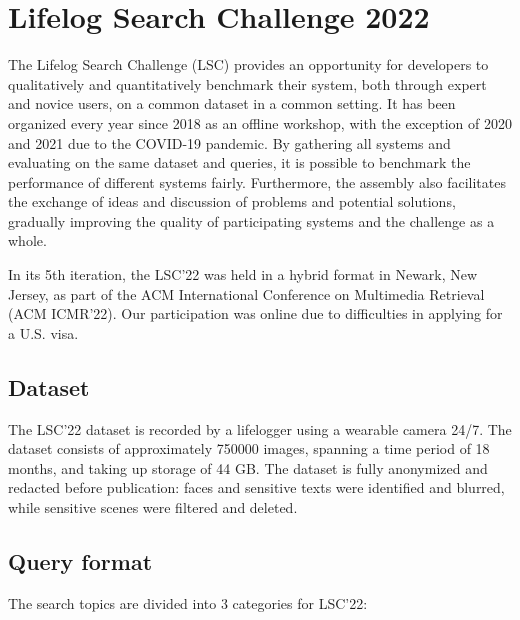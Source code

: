 \section{Lifelog Search Challenge 2022}

The Lifelog Search Challenge (LSC) provides an opportunity for developers to qualitatively and quantitatively benchmark their system, both through expert and novice users, on a common dataset in a common setting. It has been organized every year since 2018 as an offline workshop, with the exception of 2020 and 2021 due to the COVID-19 pandemic. By gathering all systems and evaluating on the same dataset and queries, it is possible to benchmark the performance of different systems fairly. Furthermore, the assembly also facilitates the exchange of ideas and discussion of problems and potential solutions, gradually improving the quality of participating systems and the challenge as a whole.

In its 5th iteration, the LSC'22 was held in a hybrid format in Newark, New Jersey, as part of the ACM International Conference on Multimedia Retrieval (ACM ICMR'22). Our participation was online due to difficulties in applying for a U.S. visa.

\subsection{Dataset}

The LSC'22 dataset is recorded by a lifelogger using a wearable camera 24/7. The dataset consists of approximately 750000 images, spanning a time period of 18 months, and taking up storage of 44 GB. The dataset is fully anonymized and redacted before publication: faces and sensitive texts were identified and blurred, while sensitive scenes were filtered and deleted. 

\subsection{Query format}

The search topics are divided into 3 categories for LSC'22:


